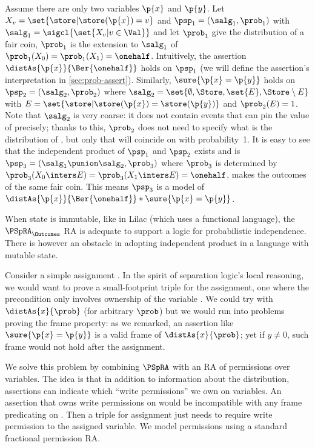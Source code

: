 \documentclass[acmsmall,nonacm,screen,appendix]{acmart}
\begin{document}
\begin{example}
\label{ex:indip-prod}
  Assume there are only two variables $\p{x}$ and $\p{y}$.
  Let $X_v = \set{ \store | \store(\p{x}) = v}$
  and  $\psp_1 = (\salg_1,\prob_1) $ with
  $ \salg_1 = \sigcl{\set{ X_v | v \in \Val}} $
  and let $ \prob_1 $ give  the distribution of a fair coin,
  \ie $ \prob_1 $ is
  the extension to $\salg_1$ of
  $ \prob_1(X_0) = \prob_1(X_1) = \onehalf $.
  Intuitively, the assertion $\distAs{\p{x}}{\Ber{\onehalf}}$ holds
  on $\psp_1$
  (we will define the assertion's interpretation in \cref{sec:prob-assert}).
  Similarly, $\sure{\p{x}=\p{y}}$ holds on $\psp_2 = (\salg_2, \prob_2)$
  where
  $
    \salg_2 = \set{\emptyset, \Store, \set{E}, \Store\setminus E}
  $ with $ E = \set{\store | \store(\p{x})=\store(\p{y})} $
  and $\prob_2(E) = 1$.
  Note that $\salg_2$ is very coarse:
  it does not contain events that can pin the value of  precisely;
  thanks to this, $\prob_2$ does not need to specify what is the distribution of , but only that  will coincide on  with probability~1.
  It is easy to see that the independent product of $\psp_1$ and $\psp_2$
  exists and is $\psp_3 = (\salg_1 \punion \salg_2, \prob_3)$
  where $\prob_3$ is determined by
  $ \prob_3(X_0 \inters E) = \prob_3(X_1 \inters E) = \onehalf $,
  \ie makes   the outcomes of the same fair coin.
  This means $\psp_3$ is a model of $\distAs{\p{x}}{\Ber{\onehalf}} * \sure{\p{x}=\p{y}}$.
\end{example}


When state is immutable, like in Lilac (which uses a functional language),
the $\PSpRA_\Outcomes$ RA is adequate to support a logic for probabilistic independence.
There is however an obstacle in adopting independent product in a language
with mutable state.

\begin{example}
  Consider a simple assignment .
  In the spirit of separation logic's local reasoning,
  we would want to prove a
  small-footprint triple for the assignment, \ie one where the precondition
  only involves ownership of the variable .
  We could try with $ \distAs{x}{\prob} $ (for arbitrary $\prob$)
  but we would run into problems proving the frame property:
  as we remarked, an assertion like $\sure{\p{x}=\p{y}}$ is
  a valid frame of $ \distAs{x}{\prob} $;
  yet if $y \ne 0$, such frame would not hold after the assignment.
\end{example}

We solve this problem by combining $\PSpRA$ with an RA of permissions over variables.
The idea is that in addition to information about the distribution,
assertions can indicate which ``write permissions'' we own on variables.
An assertion that owns write permissions on  would be incompatible
with any frame predicating on .
Then a triple for assignment just needs to require write permission
to the assigned variable.
We model permissions using a standard fractional permission RA.
\end{document}
